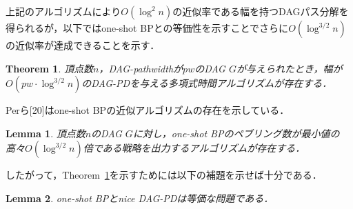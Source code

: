 \documentclass[master]{kuisthesis}		%
\theoremstyle{plain}
\newtheorem{theorem}{Theorem}
\newtheorem{lemma}{Lemma}
\theoremstyle{definition}
\begin{document}
上記のアルゴリズムにより$O(\log ^2 n)$の近似率である幅を持つDAGパス分解を得られるが，以下ではone-shot BPとの等価性を示すことでさらに$O(\log ^{3/2} n)$の近似率が達成できることを示す．

\begin{theorem}\label{approximation2}
    頂点数$n$，DAG-pathwidthが$pw$のDAG $G$が与えられたとき，幅が$O(pw \cdot \log ^{3/2} n)$のDAG-PDを与える多項式時間アルゴリズムが存在する．
\end{theorem}


Perら[20]はone-shot BPの近似アルゴリズムの存在を示している．

\begin{lemma}
    頂点数$n$のDAG $G$に対し，one-shot BPのペブリング数が最小値の高々$O(\log ^{3/2} n)$倍である戦略を出力するアルゴリズムが存在する．
\end{lemma}

したがって，Theorem~\ref{approximation2}を示すためには以下の補題を示せば十分である．

\begin{lemma}\label{lemma_approximation2}
    one-shot BPとnice DAG-PDは等価な問題である．
\end{lemma}
\end{document}
